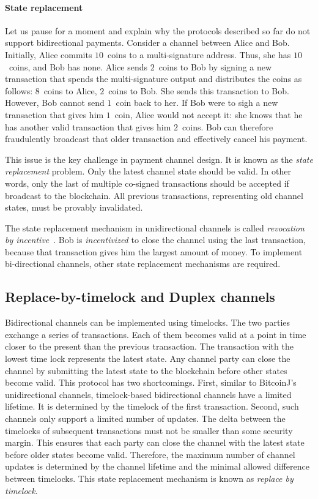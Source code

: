 \paragraph{State replacement}
Let us pause for a moment and explain why the protocols described so far do not support bidirectional payments.
Consider a channel between Alice and Bob.
Initially, Alice commits $10$~coins to a multi-signature address.
Thus, she has $10$~coins, and Bob has none.
Alice sends $2$~coins to Bob by signing a new transaction that spends the multi-signature output and distributes the coins as follows: $8$~coins to Alice, $2$~coins to Bob.
She sends this transaction to Bob.
However, Bob cannot send $1$~coin back to her.
If Bob were to sigh a new transaction that gives him $1$~coin, Alice would not accept it: she knows that he has another valid transaction that gives him $2$~coins.
Bob can therefore fraudulently broadcast that older transaction and effectively cancel his payment.

This issue is the key challenge in payment channel design.
It is known as the \textit{state replacement} problem.
Only the latest channel state should be valid.
In other words, only the last of multiple co-signed transactions should be accepted if broadcast to the blockchain.
All previous transactions, representing old channel states, must be provably invalidated.

The state replacement mechanism in unidirectional channels is called \textit{revocation by incentive}~\cite{Gudgeon2019}.
Bob is \textit{incentivized} to close the channel using the last transaction, because that transaction gives him the largest amount of money.
To implement bi-directional channels, other state replacement mechanisms are required.


\subsection{Replace-by-timelock and Duplex channels}

Bidirectional channels can be implemented using timelocks.
The two parties exchange a series of transactions.
Each of them becomes valid at a point in time closer to the present than the previous transaction.
The transaction with the lowest time lock represents the latest state.
Any channel party can close the channel by submitting the latest state to the blockchain before other states become valid.
This protocol has two shortcomings.
First, similar to BitcoinJ's unidirectional channels, timelock-based bidirectional channels have a limited lifetime.
It is determined by the timelock of the first transaction.
Second, such channels only support a limited number of updates.
The delta between the timelocks of subsequent transactions must not be smaller than some security margin.
This ensures that each party can close the channel with the latest state before older states become valid.
Therefore, the maximum number of channel updates is determined by the channel lifetime and the minimal allowed difference between timelocks.
This state replacement mechanism is known as \textit{replace by timelock}.

